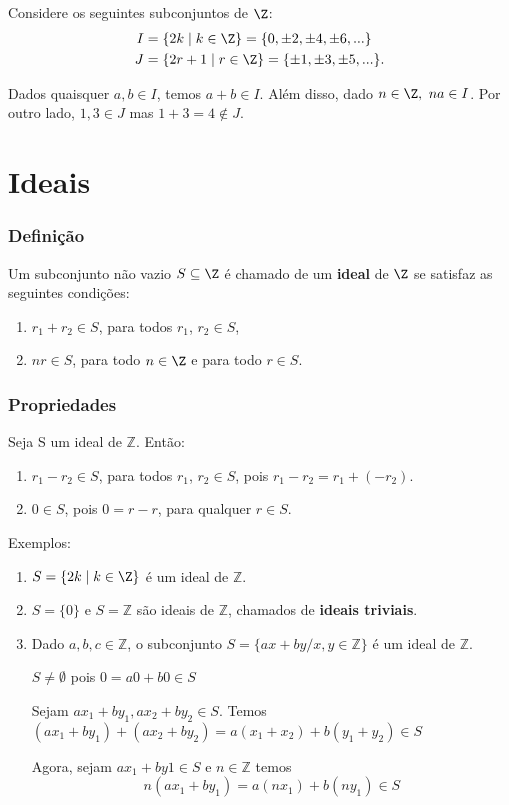 Considere os seguintes subconjuntos de $\Z$:
\begin{align*}
	I &= \{2k \mid k\in\Z\} = \{0,\pm 2,\pm 4,\pm 6,...\}\\
	J &= \{2r+1\mid r\in\Z\} = \{\pm 1,\pm 3,\pm 5,...\}.
\end{align*}

Dados quaisquer $a,b\in I$, temos $a+b\in I$. Al{\'e}m disso, dado $n\in\Z,\ na\in I$. Por outro lado, $1,3\in J$ mas $1+3=4\notin J$.

\section{Ideais}

\subsubsection{Defini{\c c}{\~a}o}
\begin{definicao}
Um subconjunto n{\~a}o vazio $S \subseteq\Z$ {\'e} chamado de um \textbf{ideal} de $\Z$ se satisfaz as seguintes condi{\c c}{\~o}es:
\begin{enumerate}
\item $r_1 + r_2\in S$, para todos $r_1$, $r_2\in S$,
\item $nr \in S$, para todo $n \in\Z$ e para todo $r \in S$.
\end{enumerate}
\end{definicao}

\subsubsection{Propriedades}
Seja S um ideal de $\mathbb{Z}$. Ent\~ao:
\begin{enumerate}
\item $r_1 - r_2\in S$, para todos $r_1$, $r_2 \in S$, pois $r_1 - r_2 = r_1 + (-r_2)$.
\item $0 \in S$, pois $0 = r - r$, para qualquer $r\in S$.
\end{enumerate}

Exemplos:
\begin{enumerate}
\item $S = \{2k \mid k \in \Z\}$ {\'e} um ideal de $\mathbb{Z}$.
\item $S=\{0\}$ e $S=\mathbb{Z}$ s{\~a}o ideais de $\mathbb{Z}$, chamados de \textbf{ideais triviais}.
\item Dado $a,b,c\in\mathbb{Z}$, o subconjunto $S=\{ax+by/x,y\in\mathbb{Z}\}$ {\'e} um ideal de $\mathbb{Z}$.

$S\neq\emptyset$ pois $0=a0+b0\in S$

Sejam $ax_{1}+by_{1},ax_{2}+by_{2}\in S$. Temos $(ax_{1}+by_{1})+(ax_{2}+by_{2})=a(x_{1}+x_{2})+b(y_{1}+y_{2})\in S$

Agora, sejam $ax_{1}+by{1}\in S$ e $n\in\mathbb{Z}$ temos \[n(ax_{1}+by_{1})=a(nx_{1})+b(ny_{1})\in S\]
\end{enumerate}

